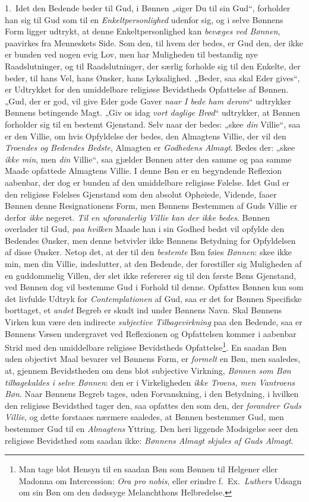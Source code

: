 \documentclass[12pt,a4paper]{book}
\newcommand{\opage}[1]{\marginnote{\footnotesize\textit{[#1]}}}
\begin{document}
1.\ Idet den Bedende beder til Gud, i Bønnen „siger Du til sin Gud“, forholder han sig til
Gud som til en \emph{Enkeltpersonlighed} udenfor sig, og i selve Bønnens Form ligger
udtrykt, at denne Enkeltpersonlighed kan \emph{bevæges ved Bønnen}, paavirkes fra Menneskets Side. Som den, til hvem der bedes, er Gud den, der ikke er bunden ved nogen
evig Lov, men har Muligheden til bestandig nye Raadslutninger, og til Raadslutninger, der
særlig forholde sig til den Enkelte, der beder, til hans Vel, hans Ønsker, hans
Lyksalighed. „Beder, saa skal Eder gives“, \opage{96}er Udtrykket for den umiddelbare religiøse
Bevidstheds Opfattelse af Bønnen. „Gud, der er god, vil give Eder gode Gaver \emph{naar I bede ham derom}“ udtrykker Bønnens betingende Magt. „Giv os idag \emph{vort daglige Brød}“
udtrykker, at Bønnen forholder sig til en bestemt Gjenstand. Selv naar der bedes: „skee \emph{din} Villie“, saa er den Villie, om hvis Opfyldelse der bedes, den Almagtens Villie, der
vil den \emph{Troendes og Bedendes Bedste}, Almagten er \emph{Godhedens Almagt}. Bedes der: „skee \emph{ikke min}, men \emph{din} Villie“, saa gjælder Bønnen atter den samme og paa samme Maade opfattede
Almagtens Villie. I denne Bøn er en begyndende Reflexion aabenbar, der dog er bunden af
den umiddelbare religiøse Følelse. Idet Gud er den religiøse Følelses Gjenstand som den
absolut Ophøiede, Vidende, faaer Bønnen denne Resignationens Form, men Bønnens Bestemmen af Guds Villie er derfor \emph{ikke} negeret. \emph{Til en uforanderlig Villie kan der ikke bedes}. Bønnen overlader til Gud, \emph{paa hvilken} Maade han i sin Godhed bedst vil opfylde den
Bedendes Ønsker, men denne betvivler ikke Bønnens Betydning for Opfyldelsen af disse
Ønsker. Netop det, at der til den \emph{bestemte} Bøn føies \emph{Bønnen}: skee ikke min, men din Villie,
indeslutter, at den Bedende, der forestiller sig Muligheden af en guddommelig Villen, der
slet ikke refererer sig til den første Bøns Gjenstand, ved Bønnen dog vil bestemme Gud i
Forhold til denne. Opfattes Bønnen kun som det livfulde Udtryk for \emph{Contemplationen} af Gud, saa er det for Bønnen Specifiske borttaget, et \emph{andet} Begreb er skudt ind under
Bønnens Navn. Skal Bønnens Virken kun være den indirecte \emph{subjective Tilbagevirkning}
paa den Bedende, saa er Bønnens Væsen undergravet ved Reflexionen og Opfattelsen kommer i
aabenbar Strid med den umiddelbare religiøse Bevidstheds Opfattelse\footnote{Man tage blot
Hensyn til en saadan Bøn som Bønnen til Helgener eller Madonna om Intercession:
\textit{Ora pro nobis}, eller erindre f.\ Ex.\ \emph{Luthers} Udsagn om sin Bøn om den dødssyge
Melanchthons Helbredelse.}. \opage{97}En saadan Bøn uden objectivt Maal bevarer vel Bønnens Form, er \emph{formelt} en Bøn, men saaledes, at, gjennem Bevidstheden om dens blot subjective Virkning,
\emph{Bønnen som Bøn tilbagekaldes i selve Bønnen}: den er i Virkeligheden \emph{ikke Troens, men Vantroens Bøn}. Naar Bønnens Begreb tages, uden Forvanskning, i den Betydning, i hvilken
den religiøse Bevidsthed tager den, saa opfattes den som den, der \emph{forandrer Guds
Villie}, og dette forstaaes nærmere saaledes, at Bønnen bestemmer Gud, men
bestemmer Gud til en \emph{Almagtens} Yttring. Den heri liggende Modsigelse seer den religiøse
Bevidsthed som saadan ikke: \emph{Bønnens Almagt skjules af Guds Almagt}.
\end{document}
